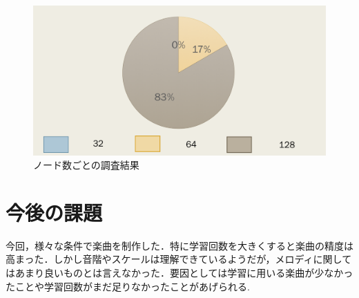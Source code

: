 \newpage
\begin{figure}[h]
    \begin{screen}
    \begin{center}
        \includegraphics[scale=0.5, clip]{./img/glaph3.png}
        \caption{ノード数ごとの調査結果}
        \label{fig:ノード数の調査結果}
    \end{center}
    \end{screen}
\end{figure}
\newpage
\section{今後の課題}
今回，様々な条件で楽曲を制作した．特に学習回数を大きくすると楽曲の精度は高まった．しかし音階やスケールは理解できているようだが，メロディに関してはあまり良いものとは言えなかった．要因としては学習に用いる楽曲が少なかったことや学習回数がまだ足りなかったことがあげられる.